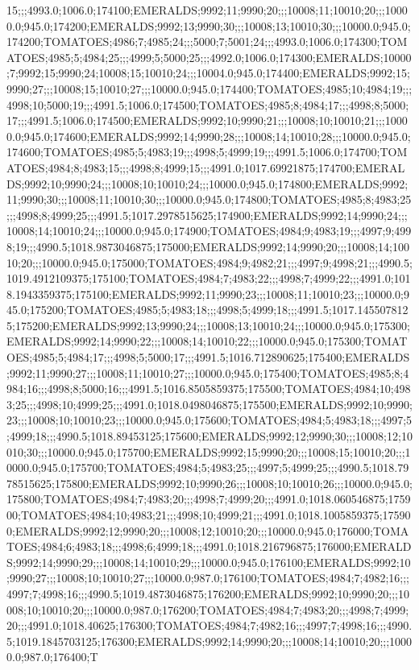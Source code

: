15;;;4993.0;1006.0;174100;EMERALDS;9992;11;9990;20;;;10008;11;10010;20;;;10000.0;945.0;174200;EMERALDS;9992;13;9990;30;;;10008;13;10010;30;;;10000.0;945.0;174200;TOMATOES;4986;7;4985;24;;;5000;7;5001;24;;;4993.0;1006.0;174300;TOMATOES;4985;5;4984;25;;;4999;5;5000;25;;;4992.0;1006.0;174300;EMERALDS;10000;7;9992;15;9990;24;10008;15;10010;24;;;10004.0;945.0;174400;EMERALDS;9992;15;9990;27;;;10008;15;10010;27;;;10000.0;945.0;174400;TOMATOES;4985;10;4984;19;;;4998;10;5000;19;;;4991.5;1006.0;174500;TOMATOES;4985;8;4984;17;;;4998;8;5000;17;;;4991.5;1006.0;174500;EMERALDS;9992;10;9990;21;;;10008;10;10010;21;;;10000.0;945.0;174600;EMERALDS;9992;14;9990;28;;;10008;14;10010;28;;;10000.0;945.0;174600;TOMATOES;4985;5;4983;19;;;4998;5;4999;19;;;4991.5;1006.0;174700;TOMATOES;4984;8;4983;15;;;4998;8;4999;15;;;4991.0;1017.69921875;174700;EMERALDS;9992;10;9990;24;;;10008;10;10010;24;;;10000.0;945.0;174800;EMERALDS;9992;11;9990;30;;;10008;11;10010;30;;;10000.0;945.0;174800;TOMATOES;4985;8;4983;25;;;4998;8;4999;25;;;4991.5;1017.2978515625;174900;EMERALDS;9992;14;9990;24;;;10008;14;10010;24;;;10000.0;945.0;174900;TOMATOES;4984;9;4983;19;;;4997;9;4998;19;;;4990.5;1018.9873046875;175000;EMERALDS;9992;14;9990;20;;;10008;14;10010;20;;;10000.0;945.0;175000;TOMATOES;4984;9;4982;21;;;4997;9;4998;21;;;4990.5;1019.4912109375;175100;TOMATOES;4984;7;4983;22;;;4998;7;4999;22;;;4991.0;1018.1943359375;175100;EMERALDS;9992;11;9990;23;;;10008;11;10010;23;;;10000.0;945.0;175200;TOMATOES;4985;5;4983;18;;;4998;5;4999;18;;;4991.5;1017.1455078125;175200;EMERALDS;9992;13;9990;24;;;10008;13;10010;24;;;10000.0;945.0;175300;EMERALDS;9992;14;9990;22;;;10008;14;10010;22;;;10000.0;945.0;175300;TOMATOES;4985;5;4984;17;;;4998;5;5000;17;;;4991.5;1016.712890625;175400;EMERALDS;9992;11;9990;27;;;10008;11;10010;27;;;10000.0;945.0;175400;TOMATOES;4985;8;4984;16;;;4998;8;5000;16;;;4991.5;1016.8505859375;175500;TOMATOES;4984;10;4983;25;;;4998;10;4999;25;;;4991.0;1018.0498046875;175500;EMERALDS;9992;10;9990;23;;;10008;10;10010;23;;;10000.0;945.0;175600;TOMATOES;4984;5;4983;18;;;4997;5;4999;18;;;4990.5;1018.89453125;175600;EMERALDS;9992;12;9990;30;;;10008;12;10010;30;;;10000.0;945.0;175700;EMERALDS;9992;15;9990;20;;;10008;15;10010;20;;;10000.0;945.0;175700;TOMATOES;4984;5;4983;25;;;4997;5;4999;25;;;4990.5;1018.7978515625;175800;EMERALDS;9992;10;9990;26;;;10008;10;10010;26;;;10000.0;945.0;175800;TOMATOES;4984;7;4983;20;;;4998;7;4999;20;;;4991.0;1018.060546875;175900;TOMATOES;4984;10;4983;21;;;4998;10;4999;21;;;4991.0;1018.1005859375;175900;EMERALDS;9992;12;9990;20;;;10008;12;10010;20;;;10000.0;945.0;176000;TOMATOES;4984;6;4983;18;;;4998;6;4999;18;;;4991.0;1018.216796875;176000;EMERALDS;9992;14;9990;29;;;10008;14;10010;29;;;10000.0;945.0;176100;EMERALDS;9992;10;9990;27;;;10008;10;10010;27;;;10000.0;987.0;176100;TOMATOES;4984;7;4982;16;;;4997;7;4998;16;;;4990.5;1019.4873046875;176200;EMERALDS;9992;10;9990;20;;;10008;10;10010;20;;;10000.0;987.0;176200;TOMATOES;4984;7;4983;20;;;4998;7;4999;20;;;4991.0;1018.40625;176300;TOMATOES;4984;7;4982;16;;;4997;7;4998;16;;;4990.5;1019.1845703125;176300;EMERALDS;9992;14;9990;20;;;10008;14;10010;20;;;10000.0;987.0;176400;T